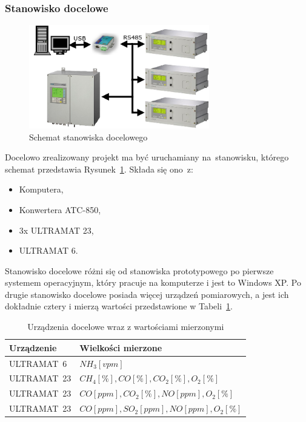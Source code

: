 \subsubsection{Stanowisko docelowe}
\begin{figure}[!htb] 	\centering 	\includegraphics[width=0.7\textwidth]{images/schemat2} 	\caption{Schemat stanowiska docelowego} \label{schemat2} \end{figure} 
Docelowo zrealizowany projekt ma być uruchamiany na~stanowisku, którego schemat przedstawia Rysunek~\ref{schemat2}. Składa się ono~z:
\begin{itemize}
\item Komputera,
\item Konwertera ATC-850,
\item 3x ULTRAMAT 23,
\item ULTRAMAT 6.
\end{itemize}
\indent
\indent Stanowisko docelowe różni się od stanowiska prototypowego po pierwsze systemem operacyjnym, który pracuje na komputerze i jest to Windows XP. Po drugie stanowisko docelowe posiada więcej urządzeń pomiarowych, a jest ich dokładnie cztery i mierzą wartości przedstawione w Tabeli~\ref{tab:docelowe}.

\begin{table}[h]
\centering
\begin{tabular}{|l|l|}
\hline Urządzenie & Wielkości mierzone \\ 
\hline ULTRAMAT~6 & $ NH_3 [vpm] $ \\ 
\hline ULTRAMAT~23 & $ CH_4 [\%], CO [\%], CO_2 [\%], O_2 [\%] $ \\ 
\hline ULTRAMAT~23 & $ CO [ppm], CO_2 [\%], NO [ppm], O_2 [\%] $ \\ 
\hline ULTRAMAT~23 & $ CO [ppm], SO_2 [ppm], NO [ppm], O_2 [\%] $ \\ 
\hline 
\end{tabular} 
\caption{Urządzenia docelowe wraz z wartościami mierzonymi}
\label{tab:docelowe}
\end{table}


